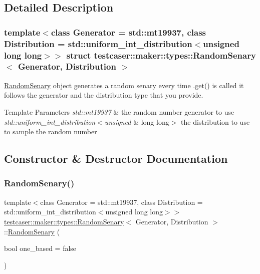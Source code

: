 \subsection{Detailed Description}
\subsubsection*{template$<$class Generator = std\+::mt19937, class Distribution = std\+::uniform\+\_\+int\+\_\+distribution$<$unsigned long long$>$$>$\newline
struct testcaser\+::maker\+::types\+::\+Random\+Senary$<$ Generator, Distribution $>$}

\mbox{\hyperlink{structtestcaser_1_1maker_1_1types_1_1RandomSenary}{Random\+Senary}} object generates a random senary every time .get() is called it follows the generator and the distribution type that you provide. 


\begin{DoxyTemplParams}{Template Parameters}
{\em std\+::mt19937} & the random number generator to use \\
\hline
{\em std\+::uniform\+\_\+int\+\_\+distribution$<$unsigned} & long long$>$ the distribution to use to sample the random number \\
\hline
\end{DoxyTemplParams}


\subsection{Constructor \& Destructor Documentation}
\mbox{\label{structtestcaser_1_1maker_1_1types_1_1RandomSenary_af9340dfac6a22f2b8dd953774ed1cf9d}} 
\subsubsection{\texorpdfstring{RandomSenary()}{RandomSenary()}}
{\footnotesize\ttfamily template$<$class Generator = std\+::mt19937, class Distribution = std\+::uniform\+\_\+int\+\_\+distribution$<$unsigned long long$>$$>$ \\
\mbox{\hyperlink{structtestcaser_1_1maker_1_1types_1_1RandomSenary}{testcaser\+::maker\+::types\+::\+Random\+Senary}}$<$ Generator, Distribution $>$\+::\mbox{\hyperlink{structtestcaser_1_1maker_1_1types_1_1RandomSenary}{Random\+Senary}} (\begin{DoxyParamCaption}\item[{bool}]{one\+\_\+based = {\ttfamily false} }\end{DoxyParamCaption})\hspace{0.3cm}{\ttfamily [inline]}}



